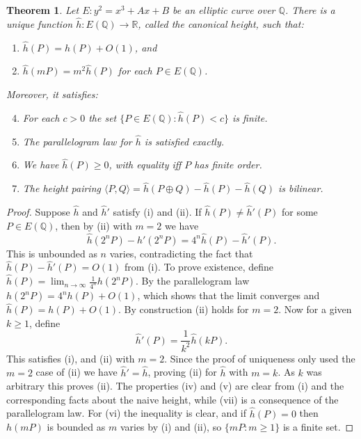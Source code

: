 \documentclass[a4paper]{article}
\newtheorem{theorem}{Theorem}
\theoremstyle{definition}
\newcommand{\Q}{\mathbb{Q}}
\newcommand{\R}{\mathbb{R}}
\begin{document}
\begin{theorem}
    Let $E:y^2=x^3+Ax+B$ be an elliptic curve over $\Q$. There is a unique
    function $\hat h:E(\Q)\to\R$, called the canonical height, such that:
    \begin{enumerate}[label=(\roman*)]
        \item $\hat h(P)=h(P)+O(1)$, and
        \item $\hat h(mP)=m^2\hat h(P)$ for each $P\in E(\Q)$.
    \end{enumerate}
    Moreover, it satisfies:
    \begin{enumerate}[label=(\roman*)]
        \setcounter{enumi}{3}
        \item For each $c>0$ the set $\{P\in E(\Q):\hat h(P)<c\}$ is
            finite.

        \item The parallelogram law for $\hat h$ is satisfied exactly.

        \item We have $\hat h(P)\ge0$, with equality iff $P$ has finite
            order.

        \item The height pairing
            $\langle P,Q\rangle=\hat h(P\oplus Q)-\hat h(P)-\hat h(Q)$ is
            bilinear.
    \end{enumerate}
\end{theorem}

\begin{proof}
    Suppose $\hat h$ and $\hat h'$ satisfy (i) and (ii). If
    $\hat h(P)\ne\hat h'(P)$ for some $P\in E(\Q)$, then by (ii) with $m=2$ we
    have
    \begin{equation*}
        \hat h(2^nP)-\hat h'(2^nP) = 4^n\hat h(P)-\hat h'(P).
    \end{equation*}
    This is unbounded as $n$ varies, contradicting the fact that
    $\hat h(P)-\hat h'(P)=O(1)$ from (i). To prove existence, define
    $\hat h(P)=\lim_{n\to\infty}\frac{1}{4^n}h(2^nP)$. By the parallelogram
    law $h(2^nP)=4^nh(P)+O(1)$, which shows that the limit converges and
    $\hat h(P)=h(P)+O(1)$. By construction (ii) holds for $m=2$. Now for a
    given $k\ge1$, define
    \begin{equation*}
        \hat h'(P) = \frac{1}{k^2}\hat h(kP).
    \end{equation*}
    This satisfies (i), and (ii) with $m=2$. Since the proof of uniqueness only
    used the $m=2$ case of (ii) we have $\hat h'=\hat h$, proving (ii) for
    $\hat h$ with $m=k$. As $k$ was arbitrary this proves (ii). The properties
    (iv) and (v) are clear from (i) and the corresponding facts about the naive
    height, while (vii) is a consequence of the parallelogram law. For (vi) the
    inequality is clear, and if $\hat h(P)=0$ then $h(mP)$ is bounded as $m$
    varies by (i) and (ii), so $\{mP:m\ge1\}$ is a finite set.
\end{proof}
\end{document}
